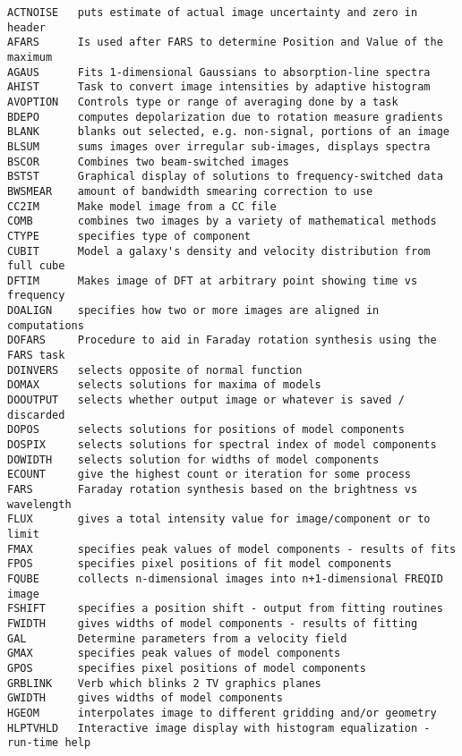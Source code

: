 
\vskip 0.5pt
\bbve\begin{verbatim}
ACTNOISE   puts estimate of actual image uncertainty and zero in header
AFARS      Is used after FARS to determine Position and Value of the maximum
AGAUS      Fits 1-dimensional Gaussians to absorption-line spectra
AHIST      Task to convert image intensities by adaptive histogram
AVOPTION   Controls type or range of averaging done by a task
BDEPO      computes depolarization due to rotation measure gradients
BLANK      blanks out selected, e.g. non-signal, portions of an image
BLSUM      sums images over irregular sub-images, displays spectra
BSCOR      Combines two beam-switched images
BSTST      Graphical display of solutions to frequency-switched data
BWSMEAR    amount of bandwidth smearing correction to use
CC2IM      Make model image from a CC file
COMB       combines two images by a variety of mathematical methods
CTYPE      specifies type of component
CUBIT      Model a galaxy's density and velocity distribution from full cube
DFTIM      Makes image of DFT at arbitrary point showing time vs frequency
DOALIGN    specifies how two or more images are aligned in computations
DOFARS     Procedure to aid in Faraday rotation synthesis using the FARS task
DOINVERS   selects opposite of normal function
DOMAX      selects solutions for maxima of models
DOOUTPUT   selects whether output image or whatever is saved / discarded
DOPOS      selects solutions for positions of model components
DOSPIX     selects solutions for spectral index of model components
DOWIDTH    selects solution for widths of model components
ECOUNT     give the highest count or iteration for some process
FARS       Faraday rotation synthesis based on the brightness vs wavelength
FLUX       gives a total intensity value for image/component or to limit
FMAX       specifies peak values of model components - results of fits
FPOS       specifies pixel positions of fit model components
FQUBE      collects n-dimensional images into n+1-dimensional FREQID image
FSHIFT     specifies a position shift - output from fitting routines
FWIDTH     gives widths of model components - results of fitting
GAL        Determine parameters from a velocity field
GMAX       specifies peak values of model components
GPOS       specifies pixel positions of model components
GRBLINK    Verb which blinks 2 TV graphics planes
GWIDTH     gives widths of model components
HGEOM      interpolates image to different gridding and/or geometry
HLPTVHLD   Interactive image display with histogram equalization - run-time help

\end{verbatim}
